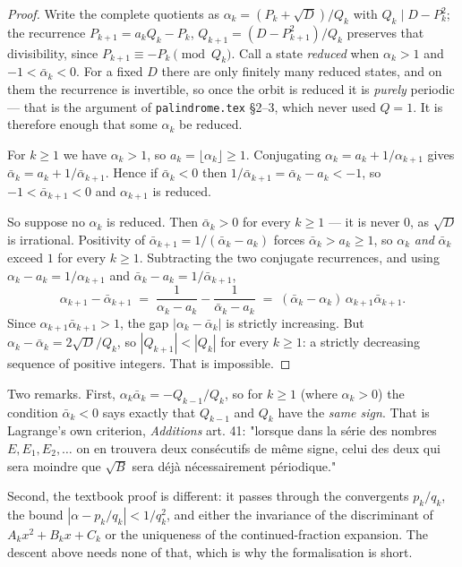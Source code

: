 \documentclass[11pt,a4paper]{article}
\theoremstyle{definition}
\theoremstyle{plain}
\begin{document}
\begin{proof}
Write the complete quotients as $\alpha_k = (P_k + \sqrt D)/Q_k$ with
$Q_k \mid D - P_k^2$; the recurrence $P_{k+1} = a_kQ_k - P_k$,
$Q_{k+1} = (D - P_{k+1}^2)/Q_k$ preserves that divisibility, since
$P_{k+1} \equiv -P_k \pmod{Q_k}$. Call a state \emph{reduced} when
$\alpha_k > 1$ and $-1 < \bar\alpha_k < 0$. For a fixed $D$ there are only
finitely many reduced states, and on them the recurrence is invertible, so once
the orbit is reduced it is \emph{purely} periodic --- that is the argument of
\texttt{palindrome.tex} §2--3, which never used $Q = 1$. It is therefore enough
that some $\alpha_k$ be reduced.

For $k \geq 1$ we have $\alpha_k > 1$, so $a_k = \lfloor\alpha_k\rfloor \geq 1$.
Conjugating $\alpha_k = a_k + 1/\alpha_{k+1}$ gives
$\bar\alpha_k = a_k + 1/\bar\alpha_{k+1}$. Hence if $\bar\alpha_k < 0$ then
$1/\bar\alpha_{k+1} = \bar\alpha_k - a_k < -1$, so
$-1 < \bar\alpha_{k+1} < 0$ and $\alpha_{k+1}$ is reduced.

So suppose no $\alpha_k$ is reduced. Then $\bar\alpha_k > 0$ for every
$k \geq 1$ --- it is never $0$, as $\sqrt D$ is irrational. Positivity of
$\bar\alpha_{k+1} = 1/(\bar\alpha_k - a_k)$ forces $\bar\alpha_k > a_k \geq 1$,
so $\alpha_k$ \emph{and} $\bar\alpha_k$ exceed $1$ for every $k \geq 1$.
Subtracting the two conjugate recurrences, and using
$\alpha_k - a_k = 1/\alpha_{k+1}$ and
$\bar\alpha_k - a_k = 1/\bar\alpha_{k+1}$,
\[
  \alpha_{k+1} - \bar\alpha_{k+1}
  \;=\; \frac{1}{\alpha_k - a_k} - \frac{1}{\bar\alpha_k - a_k}
  \;=\; (\bar\alpha_k - \alpha_k)\,\alpha_{k+1}\bar\alpha_{k+1} .
\]
Since $\alpha_{k+1}\bar\alpha_{k+1} > 1$, the gap
$|\alpha_k - \bar\alpha_k|$ is strictly increasing. But
$\alpha_k - \bar\alpha_k = 2\sqrt D/Q_k$, so $|Q_{k+1}| < |Q_k|$ for every
$k \geq 1$: a strictly decreasing sequence of positive integers. That is
impossible.
\end{proof}

Two remarks. First, $\alpha_k\bar\alpha_k = -Q_{k-1}/Q_k$, so for $k \geq 1$
(where $\alpha_k > 0$) the condition $\bar\alpha_k < 0$ says exactly that
$Q_{k-1}$ and $Q_k$ have the \emph{same sign}. That is Lagrange's own
criterion, \emph{Additions} art. 41: "lorsque dans la série des nombres
$E, E_1, E_2,\ldots$ on en trouvera deux consécutifs de même signe, celui des
deux qui sera moindre que $\sqrt B$ sera déjà nécessairement périodique."

Second, the textbook proof is different: it passes through the convergents
$p_k/q_k$, the bound $|\alpha - p_k/q_k| < 1/q_k^2$, and either the invariance
of the discriminant of $A_kx^2 + B_kx + C_k$ or the uniqueness of the
continued-fraction expansion. The descent above needs none of that, which is
why the formalisation is short.
\end{document}
